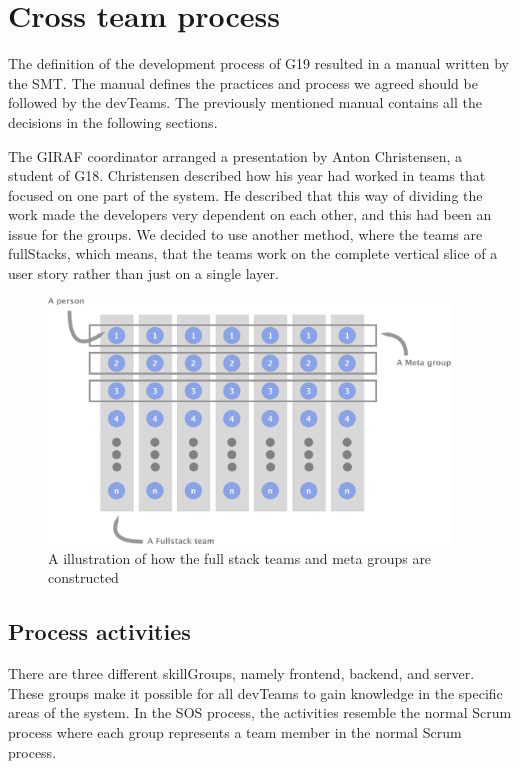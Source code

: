 \section{Cross team process}
The definition of the development process of \gls{G19} resulted in a manual\cite{processManual} written by the \gls{SMT}. The manual defines the practices and process we agreed should be followed by the \glspl{devTeam}. The previously mentioned manual contains all the decisions in the following sections.

The GIRAF coordinator arranged a presentation by Anton Christensen, a student of \gls{G18}. Christensen described how his year had worked in teams that focused on one part of the system. He described that this way of dividing the work made the developers very dependent on each other, and this had been an issue for the groups. We decided to use another method, where the teams are \Glspl{fullStack}, which means, that the teams work on the complete vertical slice of a user story rather than just on a single layer.
\begin{figure}[H]
        \begin{center}
            \includegraphics[width=0.95\textwidth]{figures/MetaGroupsFigure.pdf}
        \end{center}
        \caption{A illustration of how the full stack teams and meta groups are constructed}
        \label{fig:MetaGroupsFigure}
\end{figure}
\subsection{Process activities}
There are three different \glspl{skillGroup}, namely frontend, backend, and server. These groups make it possible for all \glspl{devTeam} to gain knowledge in the specific areas of the system. In the \gls{SOS} process, the activities resemble the normal Scrum process where each group represents a team member in the normal Scrum process.

